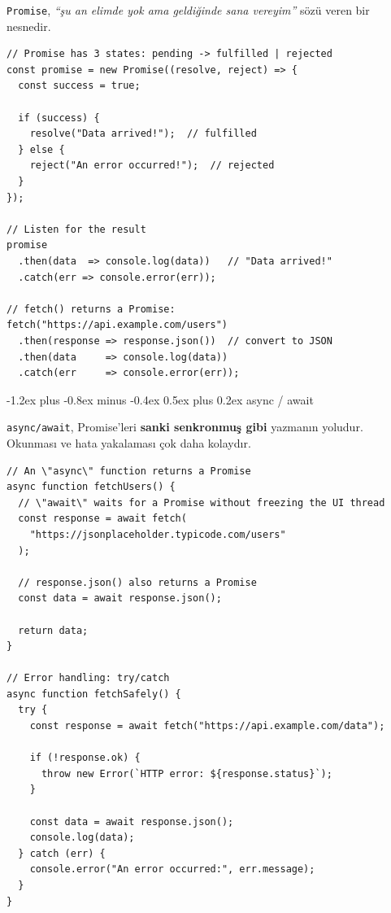 \documentclass[12pt, a4paper]{article}
\makeatletter
\renewcommand{\subsection}{%
  \@startsection{subsection}{2}{\z@}%
    {-1.2ex plus -0.8ex minus -0.4ex}%
    {0.5ex plus 0.2ex}%
    {\normalfont\large\bfseries\sffamily\color{secondary}}%
}
\makeatother
\begin{document}
\texttt{Promise}, \textit{``şu an elimde yok ama geldiğinde sana vereyim''} sözü veren bir nesnedir.

\vspace{6pt}

\begin{tcolorbox}[enhanced, colback=codebg, colframe=gray!30,
    colbacktitle=promisecol!85!black, coltitle=white, arc=4pt,
    title={\sffamily\bfseries\small Promise Mantığı}]
\begin{lstlisting}[style=jsstyle]
// Promise has 3 states: pending -> fulfilled | rejected
const promise = new Promise((resolve, reject) => {
  const success = true;

  if (success) {
    resolve("Data arrived!");  // fulfilled
  } else {
    reject("An error occurred!");  // rejected
  }
});

// Listen for the result
promise
  .then(data  => console.log(data))   // "Data arrived!"
  .catch(err => console.error(err));

// fetch() returns a Promise:
fetch("https://api.example.com/users")
  .then(response => response.json())  // convert to JSON
  .then(data     => console.log(data))
  .catch(err     => console.error(err));
\end{lstlisting}
\end{tcolorbox}

\vspace{6pt}

\subsection{async / await}

\texttt{async/await}, Promise'leri \textbf{sanki senkronmuş gibi} yazmanın yoludur.
Okunması ve hata yakalaması çok daha kolaydır.

\vspace{6pt}

\begin{tcolorbox}[enhanced, colback=codebg, colframe=gray!30,
    colbacktitle=asynccol!85!black, coltitle=white, arc=4pt,
    title={\sffamily\bfseries\small async/await --- Temel Kullanım}]
\begin{lstlisting}[style=jsstyle]
// An \"async\" function returns a Promise
async function fetchUsers() {
  // \"await\" waits for a Promise without freezing the UI thread
  const response = await fetch(
    "https://jsonplaceholder.typicode.com/users"
  );

  // response.json() also returns a Promise
  const data = await response.json();

  return data;
}

// Error handling: try/catch
async function fetchSafely() {
  try {
    const response = await fetch("https://api.example.com/data");

    if (!response.ok) {
      throw new Error(`HTTP error: ${response.status}`);
    }

    const data = await response.json();
    console.log(data);
  } catch (err) {
    console.error("An error occurred:", err.message);
  }
}
\end{lstlisting}
\end{tcolorbox}
\end{document}
